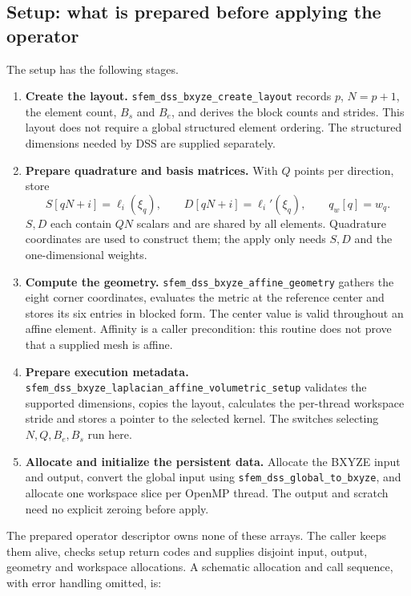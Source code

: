 \documentclass[11pt]{article}
\begin{document}
\subsection{Setup: what is prepared before applying the operator}

The setup has the following stages.
\begin{enumerate}
 \item \textbf{Create the layout.}
 \texttt{sfem\_dss\_bxyze\_create\_layout} records \(p\), \(N=p+1\),
 the element count, \(B_s\) and \(B_e\), and derives the block counts and
 strides. This layout does not require a global structured element ordering.
 The structured dimensions needed by DSS are supplied separately.
 \item \textbf{Prepare quadrature and basis matrices.}
 With \(Q\) points per direction, store
 \[
 S[qN+i]=\ell_i(\xi_q),\qquad
 D[qN+i]=\ell_i'(\xi_q),\qquad
 q_w[q]=w_q.
 \]
 \(S,D\) each contain \(QN\) scalars and are shared by all elements.
 Quadrature coordinates are used to construct them; the apply only needs
 \(S,D\) and the one-dimensional weights.
 \item \textbf{Compute the geometry.}
 \texttt{sfem\_dss\_bxyze\_affine\_geometry} gathers the eight corner
 coordinates, evaluates the metric at the reference center and stores its
 six entries in blocked form. The center value is valid throughout an affine
 element. Affinity is a caller precondition: this routine does not prove that
 a supplied mesh is affine.
 \item \textbf{Prepare execution metadata.}
 \texttt{sfem\_dss\_bxyze\_laplacian\_affine\_volumetric\_setup}
 validates the supported dimensions, copies the layout, calculates the
 per-thread workspace stride and stores a pointer to the selected kernel.
 The switches selecting \(N,Q,B_e,B_s\) run here.
 \item \textbf{Allocate and initialize the persistent data.}
 Allocate the BXYZE input and output, convert the global input using
 \texttt{sfem\_dss\_global\_to\_bxyze}, and allocate one workspace slice per
 OpenMP thread. The output and scratch need no explicit zeroing before apply.
\end{enumerate}
The prepared operator descriptor owns none of these arrays. The caller keeps
them alive, checks setup return codes and supplies disjoint input, output,
geometry and workspace allocations. A schematic allocation and call sequence,
with error handling omitted, is:
\end{document}
